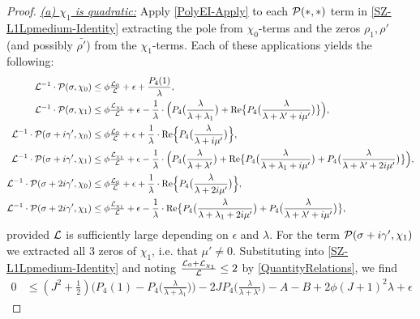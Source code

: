 \documentclass[12pt,psamsfonts]{amsart}
\theoremstyle{definition}
\theoremstyle{remark}
\numberwithin{equation}{section}
\begin{document}
\begin{proof}
\noindent
\underline{\emph{(a) $\chi_1$ is quadratic:}} Apply \cref{PolyEI-Apply} to each $\mathcal{P}(\ast, \ast)$ term in \eqref{SZ-L1Lpmedium-Identity} extracting the pole from $\chi_0$-terms and the zeros $\rho_1,\rho'$ (and possibly $\bar{\rho'}$) from the $\chi_1$-terms. Each of these applications yields the following:
\begin{align*}
\mathcal{L}^{-1} \cdot \mathcal{P}(\sigma, \chi_0) & \leq \phi  \tfrac{\mathcal{L}_0}{\mathcal{L}} + \epsilon + \frac{P_4(1)}{\lambda}, \\
\mathcal{L}^{-1} \cdot \mathcal{P}(\sigma, \chi_1) & \leq  \phi \tfrac{\mathcal{L}_{\chi_1}}{\mathcal{L}} + \epsilon - \frac{1}{\lambda} \cdot \Big( P_4\big( \frac{\lambda}{\lambda+\lambda_1} \big)  + \mathrm{Re}\big\{ P_4\big( \frac{\lambda}{\lambda+\lambda' + i\mu'} \big) \big\}  \Big), \\
\mathcal{L}^{-1} \cdot \mathcal{P}(\sigma+i\gamma', \chi_0) & \leq  \phi  \tfrac{\mathcal{L}_0}{\mathcal{L}} + \epsilon + \frac{1}{\lambda} \cdot  \mathrm{Re}\Big\{ P_4\big( \frac{\lambda}{\lambda +i\mu'} \big) \Big\}, \\
\mathcal{L}^{-1} \cdot \mathcal{P}(\sigma+i\gamma', \chi_1) & \leq \phi \tfrac{\mathcal{L}_{\chi_1}}{\mathcal{L}} + \epsilon - \frac{1}{\lambda} \cdot \Big(   P_4\big( \frac{\lambda}{\lambda+\lambda'} \big) + \mathrm{Re}\big\{ P_4\big( \frac{\lambda}{\lambda+\lambda_1+i\mu'} \big) + P_4\big( \frac{\lambda}{\lambda+\lambda'+2i\mu'} \big) \big\} \Big), \\
\mathcal{L}^{-1} \cdot \mathcal{P}(\sigma+2i\gamma', \chi_0) & \leq  \phi  \tfrac{\mathcal{L}_0}{\mathcal{L}} + \epsilon + \frac{1}{\lambda} \cdot  \mathrm{Re}\Big\{ P_4\big( \frac{\lambda}{\lambda +2i\mu'} \big) \Big\}, \\
\mathcal{L}^{-1} \cdot \mathcal{P}(\sigma+2i\gamma', \chi_1) & \leq \phi \tfrac{\mathcal{L}_{\chi_1}}{\mathcal{L}} + \epsilon  - \frac{1}{\lambda} \cdot \mathrm{Re}\big\{ P_4\big( \frac{\lambda}{\lambda+\lambda_1+2i\mu'} \big)   +  P_4\big( \frac{\lambda}{\lambda+\lambda' + i\mu'} \big)  \big\},
\end{align*}
provided $\mathcal{L}$ is sufficiently large depending on $\epsilon$ and $\lambda$. For the term $\mathcal{P}(\sigma+i\gamma',\chi_1)$ we extracted all 3 zeros of $\chi_1$, i.e. that $\mu' \neq 0$. Substituting into \eqref{SZ-L1Lpmedium-Identity} and noting $\frac{\mathcal{L}_0+\mathcal{L}_{\chi_1}}{\mathcal{L}} \leq 2$ by \cref{QuantityRelations}, we find 
\begin{equation}
\label{SZ-L1Lpmedium-Identity-a}
\begin{aligned}
0 & \leq (J^2 + \tfrac{1}{2}) \big( P_4(1) - P_4\big( \frac{\lambda}{\lambda+\lambda_1} \big) \big) - 2J P_4\big( \frac{\lambda}{\lambda+\lambda'} \big)  - A - B  + 2\phi (J+1)^2 \lambda + \epsilon

\end{aligned}
\end{equation}
\end{proof}
\end{document}
